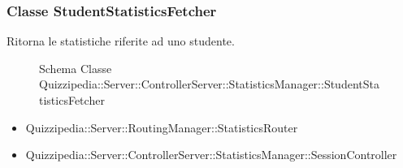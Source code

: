 \subsubsection{Classe StudentStatisticsFetcher}
Ritorna le statistiche riferite ad uno studente.
\begin{figure}[H]
\centering
\noindent{}
\caption{Schema Classe Quizzipedia::Server::ControllerServer::StatisticsManager::StudentStatisticsFetcher}
\end{figure}
\begin{itemize}
\item Quizzipedia::Server::RoutingManager::StatisticsRouter
\end{itemize}
\begin{itemize}
\item Quizzipedia::Server::ControllerServer::StatisticsManager::SessionController
\end{itemize}
